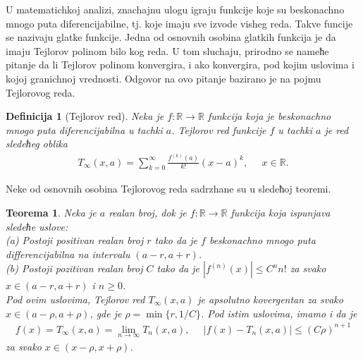 \documentclass[12pt,a4paper]{article}
\newtheorem{thm}{Teorema}%
\newtheorem{defi}{Definicija}%
\begin{document}
U matematichkoj analizi, 
znachajnu ulogu igraju funkcije koje su beskonachno 
mnogo puta 
diferencijabilne, tj. koje imaju sve izvode visheg reda. 
Takve funcije se nazivaju glatke funkcije. 
Jedna od osnovnih osobina glatkih funkcija je 
da imaju Tejlorov polinom bilo kog reda. 
U tom sluchaju, prirodno se nameћe pitanje 
da li Tejlorov polinom konvergira, i ako konvergira, 
pod kojim uslovima i kojoj granichnoj vrednosti. 
Odgovor na ovo pitanje bazirano je na pojmu 
Tejlorovog reda. 

\begin{defi}[Tejlorov red]
Neka je $f:\mathbb{R}\rightarrow\mathbb{R}$ funkcija 
koja je beskonachno mnogo puta diferencijabilna u 
tachki $a$. 
Tejlorov red funkcije $f$ u tachki $a$ je red 
sledeћeg oblika
\begin{align*}
    T_{\infty}(x,a)
    =
    \sum_{k=0}^{\infty}
    \frac{f^{(k)}(a)}{k!}(x-a)^{k}, 
    \;\;\;\;\; x\in\mathbb{R}. 
\end{align*}
\end{defi}

Neke od osnovnih osobina 
Tejlorovog reda sadrzhane su u sledeћoj teoremi. 

\begin{thm}\label{thm5}
Neka je $a$ realan broj, 
dok je $f:\mathbb{R}\rightarrow\mathbb{R}$ funkcija koja 
ispunjava sledeћe uslove: 
\\
(a) Postoji positivan realan broj $r$
tako da je $f$ beskonachno mnogo puta differencijabilna 
na intervalu $(a-r,a+r)$. 
\\
(b) Postoji pozitivan realan broj $C$ 
tako da je 
$|f^{(n)}(x)|\leq C^{n}n!$ za svako 
$x\in(a-r,a+r)$ i $n\geq 0$. 
\\
Pod ovim uslovima, 
Tejlorov red $T_{\infty}(x,a)$ je apsolutno kovergentan 
za svako $x\in(a-\rho,a+\rho)$, 
gde je $\rho=\min\{r,1/C\}$. 
Pod istim uslovima, imamo i da je 
\begin{align}
    f(x)=T_{\infty}(x,a)
    =
    \lim_{n\rightarrow\infty}T_{n}(x,a), 
    \;\;\;\;\; 
    |f(x)-T_{n}(x,a)|
    \leq 
    (C\rho)^{n+1}
\end{align}
za svako $x\in(x-\rho,x+\rho)$. 
\end{thm}
\end{document}
